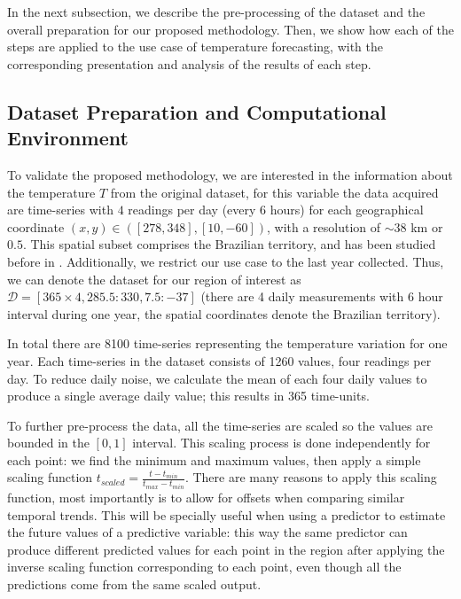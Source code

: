 In the next subsection, we describe the pre-processing of the dataset and the overall preparation for our proposed methodology. Then, we show how each of the steps are applied to the use case of temperature forecasting, with the corresponding presentation and analysis of the results of each step.

\subsection{Dataset Preparation and Computational Environment}
\label{sec:DatasetPreparation}

To validate the proposed methodology, we are interested in the information about the temperature $T$ from the original dataset, for this variable the data acquired are time-series with $4$ readings per day (every 6 hours) for each geographical coordinate $(x,y)\in ([278, 348], [10, -60])$, with a resolution of $\sim 38$ km or $0.5$\textdegree. This spatial subset comprises the Brazilian territory, and has been studied before in \cite{Souto2018}. Additionally, we restrict our use case to the last year collected. Thus, we can denote the dataset for our region of interest as $\mathcal{D} = [ 365\times 4, 285.5:330, 7.5:-37]$ (there are 4 daily measurements with 6 hour interval during one year, the spatial coordinates denote the Brazilian territory). 


In total there are 8100 time-series representing the temperature variation for one year. Each time-series in the dataset consists of 1260 values, four readings per day. To reduce daily noise, we calculate the mean of each four daily values to produce a single average daily value; this results in 365 time-units. 

To further pre-process the data, all the time-series are scaled so the values are bounded in the $[0, 1]$ interval. This scaling process is done independently for each point: we find the minimum and maximum values, then apply a simple scaling function $ t_{scaled} = \frac{t - t_{min}}{t_{max} - t_{min}}$. There are many reasons to apply this scaling function, most importantly is to allow for offsets when comparing similar temporal trends. This will be specially useful when using a predictor to estimate the future values of a predictive variable: this way the same predictor can produce different predicted values for each point in the region after applying the inverse scaling function corresponding to each point, even though all the predictions come from the same scaled output.

